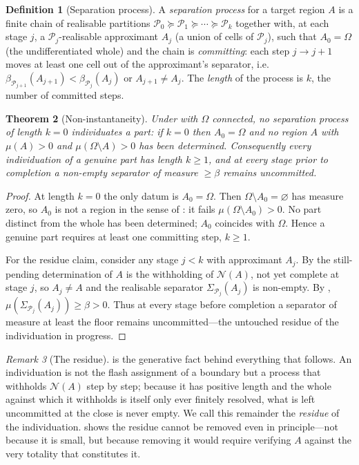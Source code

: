 \documentclass[11pt,twocolumn,a4paper]{article}
\theoremstyle{thmstyle}
\newtheorem{theorem}{Theorem}[section]
\theoremstyle{definition}
\newtheorem{definition}[theorem]{Definition}
\theoremstyle{remark}
\newtheorem{remark}[theorem]{Remark}
\newcommand{\Space}{\Omega}
\newcommand{\thick}{\beta}
\newcommand{\Part}{\mathscr{P}}
\newcommand{\Neg}{\mathcal{N}}
\begin{document}
\begin{definition}[Separation process]
\label{def:process}
A \emph{separation process} for a target region $A$ is a finite chain of
realisable partitions
$\Part_0\succeq\Part_1\succeq\cdots\succeq\Part_k$
together with, at each stage $j$, a $\Part_j$-realisable approximant $A_j$
(a union of cells of $\Part_j$), such that $A_0=\Space$ \textup{(}the
undifferentiated whole\textup{)} and the chain is \emph{committing}: each step
$j\to j+1$ moves at least one cell out of the approximant's separator, i.e.\
$\thick_{\Part_{j+1}}(A_{j+1})<\thick_{\Part_j}(A_j)$ or
$A_{j+1}\neq A_j$. The \emph{length} of the process is $k$, the number of
committed steps.
\end{definition}

\begin{theorem}[Non-instantaneity]
\label{thm:noninstant}
Under  with $\Space$ connected, no separation process of length
$k=0$ individuates a part: if $k=0$ then $A_0=\Space$ and no region $A$ with
$\mu(A)>0$ and $\mu(\Space\setminus A)>0$ has been determined. Consequently every
individuation of a genuine part has length $k\ge1$, and at every stage prior to
completion a non-empty separator of measure $\ge\thick$ remains uncommitted.
\end{theorem}

\begin{proof}
At length $k=0$ the only datum is $A_0=\Space$. Then $\Space\setminus A_0=\varnothing$
has measure zero, so $A_0$ is not a region in the sense of \Cref{def:region}: it
fails $\mu(\Space\setminus A_0)>0$. No part distinct from the whole has been
determined; $A_0$ coincides with $\Space$. Hence a genuine part requires at least
one committing step, $k\ge1$.

For the residue claim, consider any stage $j<k$ with approximant $A_j$. By
\Cref{thm:negation-unique} the still-pending determination of $A$ is the
withholding of $\Neg(A)$, not yet complete at stage $j$, so $A_j\neq A$ and the
realisable separator $\Sigma_{\Part_j}(A_j)$ is non-empty. By
, $\mu(\Sigma_{\Part_j}(A_j))\ge\thick>0$. Thus at every
stage before completion a separator of measure at least the floor remains
uncommitted---the untouched residue of the individuation in progress.
\end{proof}

\begin{remark}[The residue]
\label{rem:residue-origin}
 is the generative fact behind everything that follows. An
individuation is not the flash assignment of a boundary but a process that
withholds $\Neg(A)$ step by step; because it has positive length and the whole
against which it withholds is itself only ever finitely resolved, what is left
uncommitted at the close is never empty. We call this remainder the
\emph{residue} of the individuation. \Cref{sec:residue} shows the residue cannot
be removed even in principle---not because it is small, but because removing it
would require verifying $A$ against the very totality that constitutes it.
\end{remark}
\end{document}
